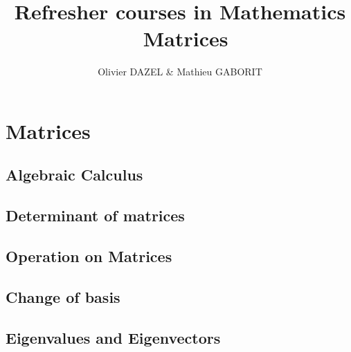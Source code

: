 \documentclass[10pt,a4paper]{report}
\title{\Large \textbf{Refresher courses in Mathematics}\\\
Matrices
}
\author{Olivier DAZEL \& Mathieu GABORIT}
\begin{document}
\maketitle




\chapter{Matrices}


\section{Algebraic Calculus}







%


\section{Determinant of matrices}








%


\section{Operation on Matrices}


\section{Change of basis}





\section{Eigenvalues and Eigenvectors}

%
\end{document}
